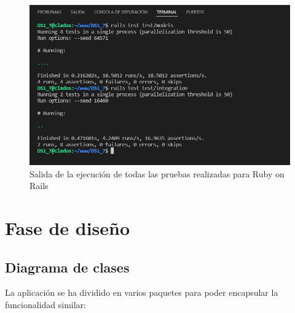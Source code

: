 \documentclass{article}
\begin{document}
\begin{figure}[H]
  \includegraphics[width=\textwidth]{imagenes/Pruebas.JPG}
  \caption{Salida de la ejecución de todas las pruebas realizadas para Ruby on Rails} 
\end{figure}

\section{Fase de diseño}
\subsection{Diagrama de clases}
La aplicación se ha dividido en varios paquetes para poder encapsular la funcionalidad similar:
\end{document}
